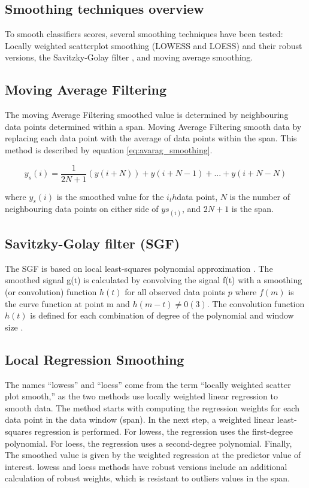 \subsection{Smoothing techniques overview}
To smooth classifiers scores, several smoothing techniques have been tested: Locally weighted scatterplot smoothing (LOWESS and LOESS) and their robust versions,  the Savitzky-Golay filter \citep{savitzky1964smoothing},  and moving average smoothing.


\subsection*{Moving Average Filtering}
The moving Average Filtering smoothed value is determined by neighbouring data points
determined within a span. Moving Average Filtering smooth data by replacing each data point with the average of data points within the span. This method is described by equation \ref{eq:avarag_smoothing}.

\begin{equation}\label{eq:avarag_smoothing}
y_s (i) = \frac{1}{2N +1} (y(i + N)) + y(i + N -1) + ... + y(i + N - N)
\end{equation}

where $y_s(i)$ is the smoothed value for the $i_th $data point, $N$ is the number of neighbouring data points on either side of $ys_(i)$, and $2N+1$ is the span.


\subsection*{Savitzky-Golay filter (SGF)}
The SGF is based on local least-squares polynomial approximation \citep{savitzky1964smoothing}. The smoothed signal g(t) is calculated by
convolving the signal f(t) with a smoothing (or convolution) function $h(t)$ for all observed data points $p$ where $f(m)$ is
the curve function at point m and $h(m - t) \neq  0 (3)$. The convolution function $h(t)$ is defined for each combination of
degree of the polynomial and window size \citep{press2007numerical}.




\subsection*{Local Regression Smoothing}
The names “lowess” and “loess” come from the term “locally weighted scatter plot smooth,” as the two methods use locally weighted linear regression to smooth data. The method starts with computing the regression weights for each data point in the data window (span). In the next step, a weighted linear least-squares regression is performed. For lowess, the regression uses the first-degree polynomial. For loess, the regression uses a second-degree polynomial. Finally, The smoothed value is given by the weighted regression at the predictor value of interest.
lowess and loess  methods have robust versions include an additional calculation of robust weights, which is resistant to outliers values in the span. 


